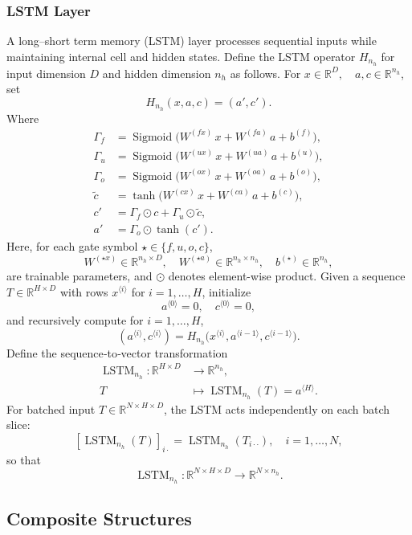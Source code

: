 \documentclass[10pt,a4paper,oneside]{article}
\DeclareMathOperator{\sigmoid}{Sigmoid}
\DeclareMathOperator{\lstm}{LSTM}
\begin{document}
\subsubsection{LSTM Layer}

A long–short term memory (LSTM) layer processes sequential inputs while maintaining internal cell and hidden states. Define the LSTM operator \(H_{n_h}\) for input dimension \(D\) and hidden dimension \(n_h\) as follows. For $x \in \mathbb{R}^D,\quad a, c \in \mathbb{R}^{n_h}$, set
\[
H_{n_h}(x,a,c) = (a',c').
\]
Where
\begin{align*}
  \Gamma_f &= \sigmoid\bigl(W^{(fx)}\,x + W^{(fa)}\,a + b^{(f)}\bigr),\\
  \Gamma_u &= \sigmoid\bigl(W^{(ux)}\,x + W^{(ua)}\,a + b^{(u)}\bigr),\\
  \Gamma_o &= \sigmoid\bigl(W^{(ox)}\,x + W^{(oa)}\,a + b^{(o)}\bigr),\\
  \tilde c  &= \tanh\bigl(W^{(cx)}\,x + W^{(ca)}\,a + b^{(c)}\bigr),\\
  c'        &= \Gamma_f \odot c + \Gamma_u \odot \tilde c,\\
  a'        &= \Gamma_o \odot \tanh(c').
\end{align*}
Here, for each gate symbol \(\star\in\{f,u,o,c\}\),
\[
W^{(\star x)}\in\mathbb{R}^{n_h\times D},\quad
W^{(\star a)}\in\mathbb{R}^{n_h\times n_h},\quad
b^{(\star)}\in\mathbb{R}^{n_h},
\]
are trainable parameters, and \(\odot\) denotes element-wise product. Given a sequence $T\in\mathbb{R}^{H\times D}$ with rows \(x^{\langle i\rangle}\) for \(i=1,\dots,H\), initialize
\[
a^{\langle 0\rangle}=0,\quad c^{\langle 0\rangle}=0,
\]
and recursively compute for \(i=1,\dots,H\),
\[
(a^{\langle i\rangle},c^{\langle i\rangle})
= H_{n_h}\bigl(x^{\langle i\rangle},a^{\langle i-1\rangle},c^{\langle i-1\rangle}\bigr).
\]
Define the sequence‑to‑vector transformation
\begin{align*}
    \lstm_{n_h}:\mathbb{R}^{H\times D}&\to\mathbb{R}^{n_h},\\
    T &\mapsto \lstm_{n_h}(T) = a^{\langle H\rangle}.
\end{align*}
For batched input $T\in\mathbb{R}^{N\times H\times D}$, the LSTM acts independently on each batch slice:
\[
\left[\lstm_{n_h}(T)\right]_{i \cdot} = \lstm_{n_h}(T_{i \cdot \cdot}),\quad i=1,\dots,N,
\]
so that
\[
\lstm_{n_h}:\mathbb{R}^{N\times H\times D}\to\mathbb{R}^{N\times n_h}.
\]

\subsection{Composite Structures}
\label{subsec:composite_structures}
\end{document}
